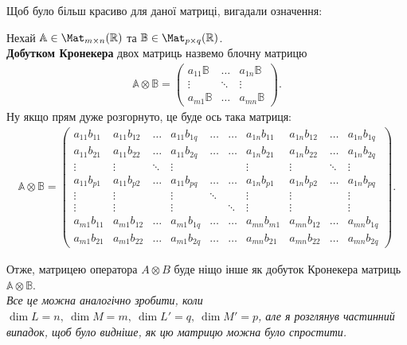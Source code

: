 \documentclass{math_library}
\begin{document}
Щоб було більш красиво для даної матриці, вигадали означення:
\begin{definition}
Нехай $\mathbb{A} \in \Mat_{m \times n}(\mathbb{R})$ та $\mathbb{B} \in \Mat_{p \times q}(\mathbb{R})$.\\
\textbf{Добутком Кронекера} двох матриць назвемо блочну матрицю
\begin{align*}
\mathbb{A} \otimes \mathbb{B} = \begin{pmatrix}
a_{11} \mathbb{B} & \dots & a_{1n} \mathbb{B} \\
\vdots & \ddots & \vdots \\
a_{m1} \mathbb{B} & \dots & a_{mn} \mathbb{B}
\end{pmatrix}.
\end{align*}
Ну якщо прям дуже розгорнуто, це буде ось така матриця:
\begin{align*}
\mathbb{A} \otimes \mathbb{B} = \begin{pmatrix}
a_{11}b_{11} & a_{11} b_{12} & \dots & a_{11} b_{1q} & \dots & \dots & a_{1n} b_{11} & a_{1n} b_{12} & \dots & a_{1n} b_{1q} \\
a_{11}b_{21} & a_{11} b_{22} & \dots & a_{11} b_{2q} & \dots & \dots & a_{1n} b_{21} & a_{1n} b_{22} & \dots & a_{1n} b_{2q} \\
\vdots & \vdots & \ddots & \vdots & & & \vdots & \vdots & \ddots & \vdots \\
a_{11}b_{p1} & a_{11} b_{p2} & \dots & a_{11} b_{pq} & \dots & \dots & a_{1n} b_{p1} & a_{1n} b_{p2} & \dots & a_{1n} b_{pq} \\
\vdots & \vdots & & \vdots & \ddots & & \vdots & \vdots &  & \vdots \\
\vdots & \vdots & & \vdots & & \ddots  & \vdots & \vdots &  & \vdots \\
a_{m1}b_{11} & a_{m1} b_{12} & \dots & a_{m1} b_{1q} & \dots & \dots & a_{mn} b_{m1} & a_{mn} b_{12} & \dots & a_{mn} b_{1q} \\
a_{m1}b_{21} & a_{m1} b_{22} & \dots & a_{m1} b_{2q} & \dots & \dots & a_{mn} b_{21} & a_{mn} b_{22} & \dots & a_{mn} b_{2q}
\end{pmatrix}.
\end{align*}
\end{definition} 

Отже, матрицею оператора $A \otimes B$ буде ніщо інше як добуток Кронекера матриць $\mathbb{A} \otimes \mathbb{B}$.
\bigskip \\
\textit{Все це можна аналогічно зробити, коли $\dim L = n,\ \dim M = m,\ \dim L' = q,\ \dim M' = p$, але я розглянув частинний випадок, щоб було видніше, як цю матрицю можна було спростити.}
\end{document}
